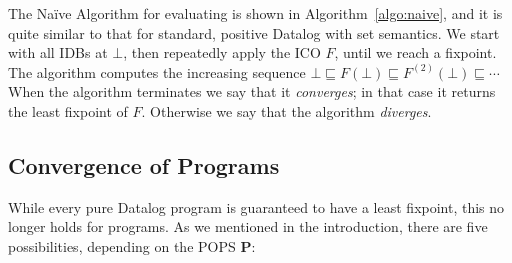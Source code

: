 The Na\"ive Algorithm for evaluating \datalogo is shown in
Algorithm~\ref{algo:naive}, and it is quite similar to that for
standard, positive  Datalog with set semantics.  We start with all IDBs
at $\bot$, then repeatedly apply the ICO $F$, until we reach a
fixpoint.
The algorithm computes the increasing sequence
$\bot \sqsubseteq F(\bot) \sqsubseteq F^{(2)}(\bot)
\sqsubseteq \cdots$ When the algorithm terminates we say that it {\em
  converges}; in that case it returns the least fixpoint of $F$.
Otherwise we say that the algorithm {\em diverges}.


\subsection{Convergence of \datalogo Programs}

\label{subsec:five:cases}


While every pure  Datalog program is guaranteed to have a least
fixpoint, this no longer holds for \datalogo programs.  As we mentioned
in the introduction, there are five possibilities, depending on the
POPS $\bm P$:

